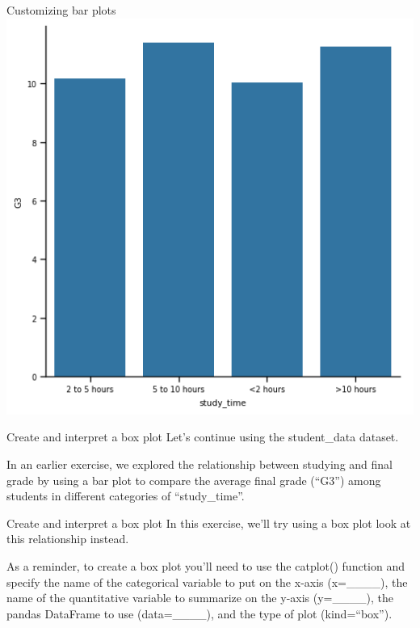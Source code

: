 \documentclass[
  ignorenonframetext,
]{beamer}
\begin{document}
\begin{frame}{Customizing bar plots}
\label{customizing-bar-plots-8}
\includegraphics{../images/im284.png}
\end{frame}

\begin{frame}{Create and interpret a box plot}
\label{create-and-interpret-a-box-plot}
Let's continue using the student\_data dataset.

In an earlier exercise, we explored the relationship between studying
and final grade by using a bar plot to compare the average final grade
(``G3'') among students in different categories of ``study\_time''.
\end{frame}

\begin{frame}{Create and interpret a box plot}
\label{create-and-interpret-a-box-plot-1}
In this exercise, we'll try using a box plot look at this relationship
instead.

As a reminder, to create a box plot you'll need to use the catplot()
function and specify the name of the categorical variable to put on the
x-axis (x=\_\_\_\_), the name of the quantitative variable to summarize
on the y-axis (y=\_\_\_\_), the pandas DataFrame to use (data=\_\_\_\_),
and the type of plot (kind=``box'').
\end{frame}
\end{document}
